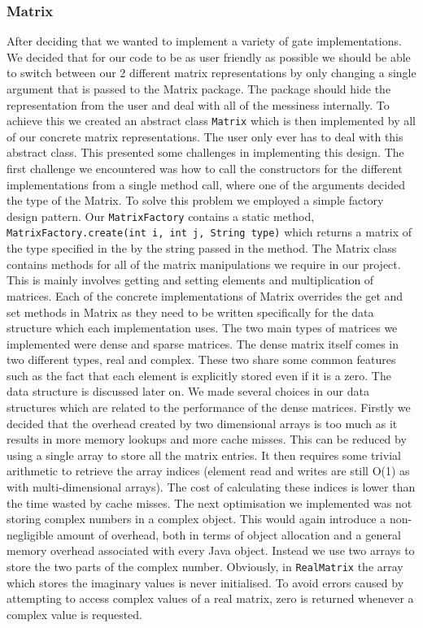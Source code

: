 \documentclass[bibliography=totocnumbered, 10pt]{article}
\theoremstyle{NoticeStyle}
\begin{document}
\subsubsection{Matrix}
After deciding that we wanted to implement a variety of gate implementations. We decided that for our code to be as user friendly as possible we should be able to switch between our 2 different matrix representations by only changing a single argument that is passed to the Matrix package. The package should hide the representation from the user and deal with all of the messiness internally.
To achieve this we created an abstract class \texttt{Matrix} which is then implemented by all of our concrete matrix representations. The user only ever has to deal with this abstract class. This presented some challenges in implementing this design. The first challenge we encountered was how to call the constructors for the different implementations from a single method call, where one of the arguments decided the type of the Matrix. To solve this problem we employed a simple factory design pattern. Our \texttt{MatrixFactory} contains a static method, \texttt{MatrixFactory.create(int i, int j, String type)} which returns a matrix of the type specified in the by the string passed in the method.
The Matrix class contains methods for all of the matrix manipulations we require in our project. This is mainly involves getting and setting elements and multiplication of matrices. Each of the concrete implementations of Matrix overrides the get and set methods in Matrix as they need to be written specifically for the data structure which each implementation uses.
The two main types of matrices we implemented were dense and sparse matrices. The dense matrix itself comes in two different types, real and complex. These two share some common features such as the fact that each element is explicitly stored even if it is a zero. The data structure is discussed later on. 
We made several choices in our data structures which are related to the performance of the dense matrices. Firstly we decided that the overhead created by two dimensional arrays is too much as it results in more memory lookups and more cache misses. This can be reduced by using a single array to store all the matrix entries. It then requires some trivial arithmetic to retrieve the array indices (element read and writes are still O(1) as with multi-dimensional arrays). The cost of calculating these indices is lower than the time wasted by cache misses. 
The next optimisation we implemented was not storing complex numbers in a complex object. This would again introduce a non-negligible amount of overhead, both in terms of object allocation and a general memory overhead associated with every Java object. Instead we use two arrays to store the two parts of the complex number. Obviously, in \texttt{RealMatrix} the array which stores the imaginary values is never initialised. To avoid errors caused by attempting to access complex values of a real matrix, zero is returned whenever a complex value is requested.
\end{document}
